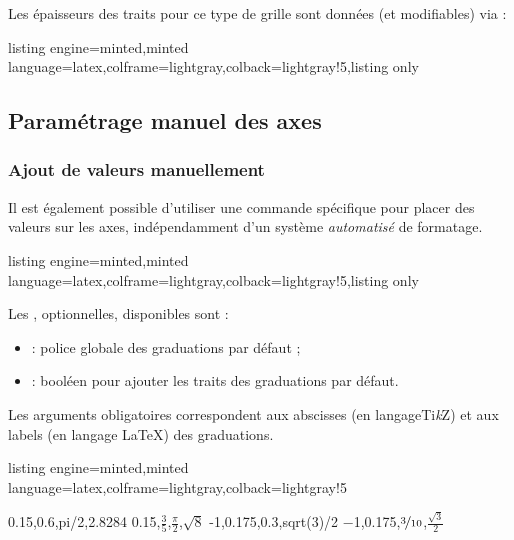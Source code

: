 \documentclass[11pt,a4paper]{ltxdoc}
\providecommand\tikzlogo{Ti\textit{k}Z}
\let\TikZ\tikzlogo
\begin{document}
Les épaisseurs des traits pour ce type de grille sont données (et modifiables) via :

\begin{tcblisting}{listing engine=minted,minted language=latex,colframe=lightgray,colback=lightgray!5,listing only}
\setlength\pflthickgridp{0.65pt}    %
\setlength\pflthickgridi{0.5pt}     %
\setlength\pflthickgrids{0.35pt}    %
\end{tcblisting}

\pagebreak

\subsection{Paramétrage manuel des axes}

\subsubsection{Ajout de valeurs manuellement}\label{ajoutvals}

Il est également possible d'utiliser une commande spécifique pour placer des valeurs sur les axes, indépendamment d'un système \textit{automatisé} de formatage.

\begin{tcblisting}{listing engine=minted,minted language=latex,colframe=lightgray,colback=lightgray!5,listing only}
\end{tcblisting}

Les \MontreCode{[clés]}, optionnelles, disponibles sont :

\smallskip

\begin{itemize}
  \item {} : police globale des graduations { par défaut} ;
  \item {} : booléen pour ajouter les traits des graduations { par défaut}.
\end{itemize}

\smallskip

Les arguments obligatoires correspondent aux abscisses (en langage\TikZ) et aux labels (en langage \LaTeX) des graduations.

\begin{tcblisting}{listing engine=minted,minted language=latex,colframe=lightgray,colback=lightgray!5}
\begin{GraphiqueTikz}%
  [x=2.75cm,y=3cm,
  Xmin=0,Xmax=3.5,Xgrille=pi/12,Xgrilles=pi/24,
  Ymin=-1.05,Ymax=1.05,Ygrille=0.2,Ygrilles=0.05]
  \TracerAxesGrilles[Grad=false,Elargir=2.5mm,]{}{}
  \RajouterValeursAxeX
    {0.15,0.6,pi/2,2.8284}
    {\num{0.15},$\frac35$,$\displaystyle\frac{\pi}{2}$,$\sqrt{8}$}
  \RajouterValeursAxeY
    {-1,0.175,0.3,sqrt(3)/2}
    {\num{-1},\num{0.175},$\nicefrac{3}{10}$,$\frac{\sqrt{3}}{2}$}
\end{GraphiqueTikz}
\end{tcblisting}
\end{document}
